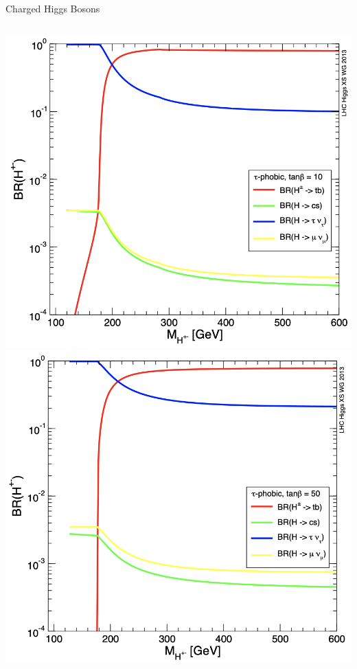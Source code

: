 \documentclass[aspectratio=169,xcolor=table]{beamer}
\begin{document}
\begin{frame}[t]{Charged Higgs Bosons}
\begin{columns}
      \centering
      \includegraphics[width=1.15\linewidth,keepaspectratio=true]{Charged_Higgs_BR.png}
      \includegraphics[width=1.15\linewidth,keepaspectratio=true]{HPlus_taunu_tanB.png}
      \end{columns}
    \end{frame} 
\end{document}
